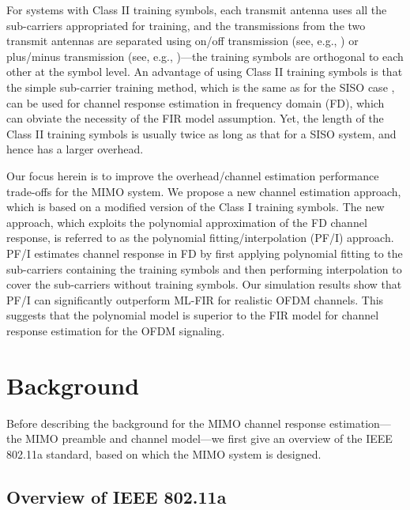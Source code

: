 \documentclass[11pt,draftnofoot,onecolumn]{IEEEtran}
\begin{document}
For systems with Class II training symbols,
each transmit antenna uses all the sub-carriers appropriated
for training, and the transmissions from the two transmit antennas
are separated using on/off transmission (see, e.g., \cite{vanZelstSchenk2004})
or plus/minus transmission (see, e.g., \cite{LiuLi2003c})---the training
symbols are orthogonal to each other at the symbol level.
An advantage of using Class II training symbols is that
the simple sub-carrier training method,
which is the same as for the SISO case \cite{LiuLi2004},
can be used for channel response
estimation in frequency domain (FD), which can obviate
the necessity of the FIR model assumption.
Yet, the length of the Class II training symbols
is usually twice as long as that for a SISO
system, and hence has a larger overhead.

Our focus herein is to improve the overhead/channel estimation performance
trade-offs for the MIMO system. We propose a new channel estimation
approach, which is based on a modified version
of the Class I training symbols.
The new approach, which exploits the polynomial approximation \cite{WangLiu2002}
of the FD channel response,
is referred to as the polynomial fitting/interpolation (PF/I)
approach. PF/I estimates channel response in FD
by first applying polynomial fitting to the sub-carriers
containing the training symbols and then performing interpolation to
cover the sub-carriers
without training symbols.
Our simulation results show that PF/I
can significantly outperform
ML-FIR for realistic OFDM channels.
This suggests that the polynomial model is superior to the
FIR model for channel response estimation for the OFDM signaling.

\section{Background}
\label{sec2}

Before describing the background for the MIMO channel response
estimation---the MIMO preamble and channel model---we first
give an overview of the IEEE 802.11a standard, based on
which the MIMO system is designed.


\subsection{Overview of IEEE 802.11a}
\end{document}
